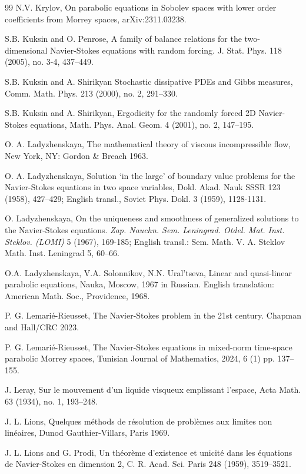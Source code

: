 \documentclass[11pt,reqno]{amsart}
\theoremstyle{definition}
\theoremstyle{remark}
\newcommand{\<}{\langle}
\renewcommand{\>}{\rangle}
\begin{document}
\begin{thebibliography}{99}
 N.V. Krylov, On parabolic equations 
in Sobolev spaces with lower order coefficients from Morrey spaces, 
arXiv:2311.03238. 

 
 S.B. Kuksin and O. Penrose, 
A family of balance relations for the two-dimensional Navier-Stokes equations 
with random forcing. J. Stat. Phys. 118 (2005), no. 3-4, 437--449. 

S.B. Kuksin and A. Shirikyan
Stochastic dissipative PDEs and Gibbs measures, 
Comm. Math. Phys. 213 (2000), no. 2, 291--330.

S.B. Kuksin and  A. Shirikyan, Ergodicity for the randomly 
forced 2D Navier-Stokes equations, Math. Phys. Anal. Geom. 4 (2001), no. 2, 147--195.
 
 O. A. Ladyzhenskaya, 
The mathematical theory of viscous incompressible flow, 
 New York, NY: Gordon \& Breach 1963. 

 O. A. Ladyzhenskaya, 
Solution ‘in the large’ of boundary value problems 
for the Navier-Stokes equations in two space variables, 
Dokl. Akad. Nauk SSSR 123 (1958), 427--429; English transl., Soviet Phys. Dokl. 
3 (1959), 1128-1131. 

O. Ladyzhenskaya, On the uniqueness and smoothness of 
generalized solutions to the Navier-Stokes equations. 
{\em Zap. Nauchn. Sem. Leningrad. Otdel. Mat. Inst. Steklov. (LOMI)\/} 
5 (1967), 169-185; English
transl.: Sem. Math. V. A. Steklov Math. 
Inst. Leningrad 5, 60--66. 

 O.A. Ladyzhenskaya, 
V.A.  Solonnikov, N.N.  Ural'tseva, Linear and quasi-linear
parabolic equations, Nauka, Moscow, 1967 in Russian. English translation: 
American Math. Soc., Providence, 1968. 

 P. G. Lemari\'e-Rieusset, 
The Navier-Stokes problem in the 21st century. Chapman and Hall/CRC 2023.

 P. G. Lemari\'e-Rieusset, 
The Navier-Stokes equations in mixed-norm time-space parabolic  
Morrey spaces, Tunisian Journal of Mathematics, 2024, 6 (1) pp. 137--155.

 J. Leray, 
Sur le mouvement d'un liquide visqueux emplissant l'espace, 
Acta Math. 63 (1934), no. 1, 193--248. 
 
J. L. Lions, Quelques m\'ethods de r\'esolution de probl\`emes 
aux limites non lin\'eaires, Dunod Gauthier-Villars, Paris 1969.

 J. L. Lions and G. Prodi, 
Un th\'eor\`eme d’existence et unicit\'e dans les \'equations 
de Navier-Stokes en dimension 2, C. R. Acad. Sci. Paris 248 (1959), 3519--3521.


\end{thebibliography}
\end{document}
